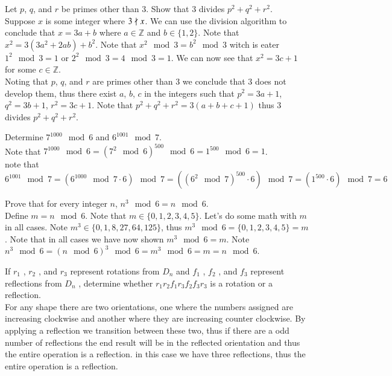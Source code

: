 \documentclass[12pt]{article}
\makeatletter
\theoremstyle{homework}
\newenvironment{exercise}[1]
{\def\@currentlabel{#1}\exercisecore}
{\endexercisecore}
\makeatother
\begin{document}
\begin{exercise}
{0.14}
Let $p$, $q$, and $r$ be primes other than $3$. Show that $3$ divides $p^2 +q^2 + r^2$.\\
Suppose $x$ is some integer where $3 \not\mid x$.  We can use the division algorithm to conclude that $x=3a+b$ where $a\in\mathbb{Z}$ and $b\in\{1,2 \}$.  Note that $x^2=3(3a^2+2ab)+b^2$.  Note that $x^2 \mod 3 =b^2 \mod 3$  witch is eater $1^2\mod 3=1$ or $2^2\mod 3=4\mod 3=1$.  We can now see that $x^2=3c+1$ for some $c\in\mathbb{Z}$.\\
Noting that $p$, $q$, and $r$ are primes other than $3$ we conclude that $3$ does not develop them, thus there exist $a$, $b$, $c$ in the integers such that $p^2=3a+1$, $q^2=3b+1$, $r^2=3c+1$.  Note that $p^2 +q^2 + r^2=3(a+b+c+1)$ thus $3$ divides $p^2 +q^2 + r^2$.
\end{exercise}

\begin{exercise}
{0.16}
Determine $7^{1000} \mod 6$ and $6^{1001} \mod 7$.\\
Note that $7^{1000} \mod 6=(7^2 \mod 6)^{500} \mod 6=1^{500}\mod 6=1$.\\
note that $6^{1001} \mod 7=(6^{1000} \mod 7\cdot 6) \mod 7=((6^2 \mod 7)^{500}\cdot 6) \mod 7=(1^{500}\cdot 6) \mod 7=6$
\end{exercise}

\begin{exercise}
{0.38}
Prove that for every integer $n$, $n^3 \mod 6 = n \mod 6$.\\
Define $m=n \mod 6$.  Note that $m\in \{0,1,2,3,4,5\}$.  Let's do some math with $m$ in all cases.  Note $m^3\in\{0,1,8,27,64,125\}$, thus $m^3 \mod 6=\{0,1,2,3,4,5\}=m$.  Note that in all cases we have now shown $m^3 \mod 6=m$.  Note $n^3 \mod 6 = (n\mod 6)^3 \mod 6 = m^3 \mod 6=m = n \mod 6$.
\end{exercise}

\begin{exercise}
{1.10}
If $r_1$ , $r_2$ , and $r_3$ represent rotations from $D_n$ and $f_1$ , $f_2$ , and $f_3$ represent
reflections from $D_n$ , determine whether $r_1 r_2 f_1 r_3 f_2 f_3 r_3$ is a rotation
or a reflection.\\
For any shape there are two orientations, one where the numbers assigned are increasing clockwise and another where they are increasing counter clockwise.  By applying a reflection we transition between these two, thus if there are a odd number of reflections the end result will be in the reflected orientation and thus the entire operation is a reflection.  in this case we have three reflections, thus the entire operation is a reflection.
\end{exercise}
\end{document}
